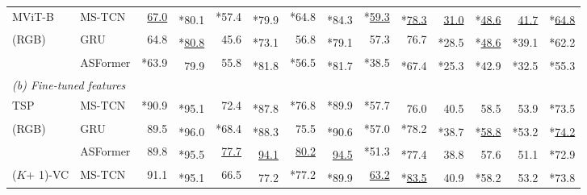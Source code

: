 \documentclass[runningheads]{llncs}
\newcommand{\notation}[1]{\ensuremath{#1}\xspace}
\newcommand{\NumClasses}{\notation{K}}
\newcommand{\best}[1]{\underline{#1}}
\newcommand{\nms}{\textsuperscript{\textdagger}}
\newcommand{\loss}{*}
\begin{document}
\begin{table*}[t]
{\begin{tabularx}{\textwidth}{ll
        rr
        rr
        rr
        rr
        rr
        rr
    }
        MViT-B~\cite{mvit}
        & MS-TCN
            & \best{67.0} & \nms \loss 80.1
            & \loss 57.4 & \nms \loss 79.9
            & \loss 64.8 & \nms \loss 84.3
            & \loss \best{59.3} & \nms \loss \best{78.3}
            & \nms \best{31.0} & \nms \loss \best{48.6}
            & \nms \best{41.7} & \nms \loss \best{64.8}
            \\

        (RGB)
        & GRU
            & 64.8 & \nms \loss \best{80.8}
            & 45.6 & \nms \loss 73.1
            & 56.8 & \nms \loss 79.1
            & 57.3 & 76.7
            & \nms \loss 28.5 & \nms \loss \best{48.6}
            & \nms \loss 39.1 & \nms \loss 62.2
            \\

        & ASFormer
            & \loss 63.9 & \nms 79.9
            & 55.8 & \nms \loss  81.8
            & \loss 56.5 & \nms \loss 81.7
            & \loss 38.5 & \nms \loss 67.4
            & \nms \loss 25.3 & \nms \loss 42.9
            & \nms \loss 32.5 & \nms \loss 55.3 \\

        \midrule
        \multicolumn{12}{l}{\em (b) Fine-tuned features} \\
        TSP~\cite{tsp}
        & MS-TCN
            & \loss 90.9 & \nms \loss95.1
            & 72.4 & \nms \loss 87.8
            & \loss76.8 & \loss 89.9
            & \loss 57.7 & \nms 76.0
            & \nms 40.5 & \nms 58.5
            & \nms 53.9 & \nms \loss 73.5
            \\

        (RGB)
        & GRU
            & 89.5 & \nms \loss 96.0
            & \loss 68.4 & \nms \loss 88.3
            & 75.5 & \nms \loss 90.6
            & \loss 57.0 & \loss 78.2
            & \nms \loss 38.7 & \nms \loss \best{58.8}
            & \nms \loss 53.2 & \nms \loss \best{74.2}
            \\

        & ASFormer
            & 89.8 & \nms\loss 95.5
            & \best{77.7} & \nms \best{94.1}
            & \best{80.2} & \nms \best{94.5}
            & \loss 51.3 & \nms \loss 77.4
            & \nms 38.8 & \nms 57.6
            & \nms 51.1 & \nms\loss 72.9
            \\

        (\NumClasses + 1)-VC
        & MS-TCN
            & 91.1 & \nms \loss 95.1
            & 66.5 & \nms 77.2
            & \loss 77.2 & \nms \loss 89.9
            & \best{63.2} & \nms \loss \best{83.5}
            & \nms 40.9 & \nms \loss 58.2
            & \nms 53.2 & \nms \loss 73.8
            \\


\end{tabularx}}
\end{table*}
\end{document}
